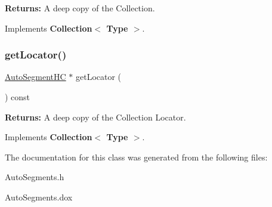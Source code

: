 {\bfseries Returns\+:} A deep copy of the Collection. 

Implements \textbf{ Collection$<$ Type $>$}.

\mbox{\label{classKatabatic_1_1AutoSegments__Aligneds_a07665c070fcc269aec02ce842f384483}} 
\subsubsection{\texorpdfstring{get\+Locator()}{getLocator()}}
{\footnotesize\ttfamily \hyperlink{namespaceKatabatic_acb3628dc7705fefe38a665cfe43efa6e}{Auto\+Segment\+HC} $\ast$ get\+Locator (\begin{DoxyParamCaption}{ }\end{DoxyParamCaption}) const\hspace{0.3cm}{\ttfamily [virtual]}}

{\bfseries Returns\+:} A deep copy of the Collection Locator. 

Implements \textbf{ Collection$<$ Type $>$}.



The documentation for this class was generated from the following files\+:\begin{DoxyCompactItemize}
\item 
Auto\+Segments.\+h\item 
Auto\+Segments.\+dox\end{DoxyCompactItemize}
